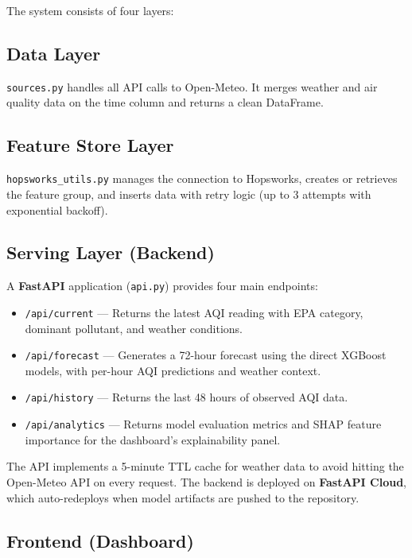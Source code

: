 \documentclass[12pt, a4paper]{article}
\begin{document}
The system consists of four layers:

\subsection{Data Layer}

\texttt{sources.py} handles all API calls to Open-Meteo.  It merges weather and air quality data on the time column and returns a clean DataFrame.

\subsection{Feature Store Layer}

\texttt{hopsworks\_utils.py} manages the connection to Hopsworks, creates or retrieves the feature group, and inserts data with retry logic (up to 3 attempts with exponential backoff).

\subsection{Serving Layer (Backend)}

A \textbf{FastAPI} application (\texttt{api.py}) provides four main endpoints:

\begin{itemize}
  \item \texttt{/api/current} --- Returns the latest AQI reading with EPA category, dominant pollutant, and weather conditions.
  \item \texttt{/api/forecast} --- Generates a 72-hour forecast using the direct XGBoost models, with per-hour AQI predictions and weather context.
  \item \texttt{/api/history} --- Returns the last 48 hours of observed AQI data.
  \item \texttt{/api/analytics} --- Returns model evaluation metrics and SHAP feature importance for the dashboard's explainability panel.
\end{itemize}

The API implements a 5-minute TTL cache for weather data to avoid hitting the Open-Meteo API on every request.  The backend is deployed on \textbf{FastAPI Cloud}, which auto-redeploys when model artifacts are pushed to the repository.

\subsection{Frontend (Dashboard)}
\end{document}
